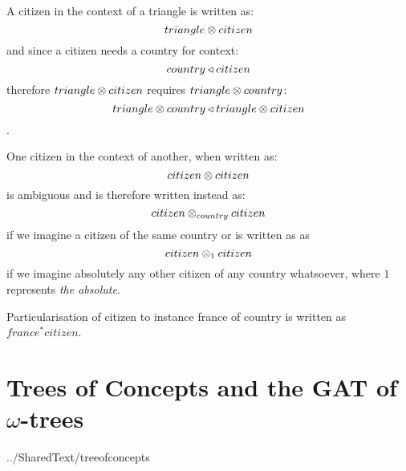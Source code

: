\documentclass[10pt,a4paper]{article}
\begin{document}
A citizen in the context of a triangle is written as:
$$
triangle \otimes citizen
$$
and since a citizen needs a country for context:
$$
country \triangleleft citizen
$$
 therefore $triangle \otimes citizen$ requires $triangle \otimes country$:
$$ triangle \otimes country \triangleleft triangle \otimes citizen$$.


One citizen in the context of another, when written as:
$$citizen \otimes citizen$$
is ambiguous and is therefore written instead as:
$$citizen \otimes_{country} citizen$$
if we imagine a citizen of the same country or is written as as
$$citizen \otimes_1 citizen$$
if we imagine absolutely any other citizen of any country whatsoever, 
where $1$ represents \textit{the absolute}. 

Particularisation of  citizen to instance france of country is written as
$france^*citizen$.

\section{Trees of Concepts and the GAT of $\omega$-trees}
 {../SharedText/treeofconcepts}



\end{document}
